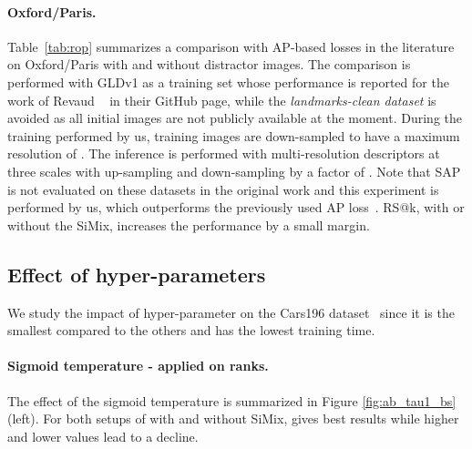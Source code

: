 \paragraph{Oxford/Paris.} Table~\ref{tab:rop} summarizes a comparison with AP-based losses in the literature on Oxford/Paris with and without distractor images. The comparison is performed with GLDv1 as a training set whose performance is reported for the work of Revaud \etal~\cite{rar+19} in their GitHub page, while the \emph{landmarks-clean dataset} is avoided as all initial images are not publicly available at the moment. During the training performed by us, training images are down-sampled to have a maximum resolution of . 
The inference is performed with multi-resolution descriptors at three scales with up-sampling and down-sampling by a factor of .
Note that SAP is not evaluated on these datasets in the original work and this experiment is performed by us, which outperforms the previously used AP loss~\cite{hls18}. RS@k, with or without the SiMix, increases the performance by a small margin. 


\subsection{Effect of hyper-parameters}
\label{sec:effect_hyperparams}

We study the impact of hyper-parameter on the Cars196 dataset~\cite{ksd+13} since it is the smallest compared to the others and has the lowest training time. 

\paragraph{Sigmoid temperature  - applied on ranks.}
The effect of the sigmoid temperature  is summarized in Figure \ref{fig:ab_tau1_bs} (left). For both setups of with and without SiMix,  gives best results while higher and lower values lead to a decline.

